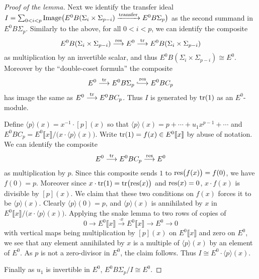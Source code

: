 \documentclass{gtpart}
\theoremstyle{definition}
\theoremstyle{remark}
\newcommand*{\longhookrightarrow}{\ensuremath{\lhook\joinrel\relbar\joinrel\rightarrow}}
\begin{document}
\begin{proof}[Proof of the lemma]
 Next we identify the transfer ideal $I = \sum_{0<i<p} 
 {\rm Image}\big(E^0 B(\Sigma_i\times\Sigma_{p-i}) 
 \xrightarrow{\rm transfer} E^0 B\Sigma_{p}\big)$ as the second summand in 
 $E^0 B\Sigma_p$.  Similarly to the above, for all $0 < i < p$, we can 
 identify the composite 
 \[
  E^0 B(\Sigma_i \times \Sigma_{p-i}) \stackrel{\rm res}{\longrightarrow} 
  E^0 \stackrel{\rm tr}{\longrightarrow} 
  E^0 B(\Sigma_i \times \Sigma_{p-i}) 
 \]
 as multiplication by an invertible scalar, and thus 
 $E^0 B(\Sigma_i \times \Sigma_{p-i}) \cong E^0$.  Moreover by the 
 ``double-coset formula'' the composite 
 \[
  E^0 \stackrel{\rm tr}{\longrightarrow} E^0 B\Sigma_p 
  \stackrel{\rm res}{\longhookrightarrow} E^0 BC_p 
 \]
 has image the same as $E^0 \stackrel{\rm tr}{\longrightarrow} E^0 BC_p$.  
 Thus $I$ is generated by ${\rm tr}(1)$ as an $E^0$-module.  

 Define $\langle p \rangle(x) = x^{-1} \cdot [p](x)$ so that 
 $\langle p \rangle(x) = p + \cdots + u_1 x^{p-1} + \cdots$ and $E^0 BC_p = 
 E^0 \llbracket x \rrbracket / \big( x \cdot \langle p \rangle(x) \big)$.  
 Write ${\rm tr}(1) = f(x) \in E^0 \llbracket x \rrbracket$ by abuse of 
 notation.  We can identify the composite 
 \[
  E^0 \stackrel{\rm tr}{\longrightarrow} E^0 BC_p 
  \stackrel{\rm res}{\longrightarrow} E^0 
 \]
 as multiplication by $p$.  Since this composite sends $1$ to 
 ${\rm res}\big( f(x) \big) = f(0)$, we have $f(0) = p$.  Moreover since 
 $x \cdot {\rm tr}(1) = {\rm tr}\big( {\rm res}(x) \big)$ and 
 ${\rm res}(x) = 0$, $x \cdot f(x)$ is divisible by $[p](x)$.  We claim that 
 these two conditions on $f(x)$ forces it to be $\langle p \rangle (x)$.  
 Clearly $\langle p \rangle(0) = p$, and $\langle p \rangle(x)$ is annihilated 
 by $x$ in $E^0 \llbracket x \rrbracket / 
 \big( x \cdot \langle p \rangle(x) \big)$.  Applying the snake lemma to two 
 rows of copies of 
 \[
  0 \longrightarrow E^0 \llbracket x \rrbracket 
  \stackrel{\cdot x}{\longrightarrow} E^0 \llbracket x \rrbracket 
  \longrightarrow E^0 \longrightarrow 0 
 \]
 with vertical maps being multiplication by $[p](x)$ on 
 $E^0 \llbracket x \rrbracket$ and zero on $E^0$, we see that any element 
 annihilated by $x$ is a multiple of $\langle p \rangle(x)$ by an element of 
 $E^0$.  As $p$ is not a zero-divisor in $E^0$, the claim follows.  Thus 
 $I \cong E^0 \cdot \langle p \rangle(x)$.  

 Finally as $u_1$ is invertible in $E^0$, $E^0 B\Sigma_p/I \cong E^0$.  
\end{proof}
\end{document}
